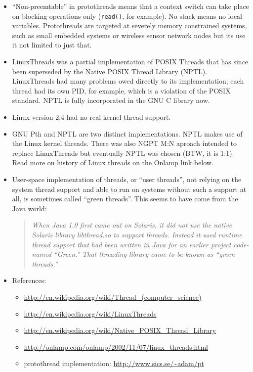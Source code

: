 \begin{itemize}
\item ``Non-preemtable'' in protothreads means that a context switch can take
place on blocking operations only (\texttt{read()}, for example). No stack means
no local variables. Protothreads are targeted at severely memory constrained
systems, such as small embedded systems or wireless sensor network nodes but its
use it not limited to just that.
\item LinuxThreads was a partial implementation of POSIX Threads that has since
been superseded by the Native POSIX Thread Library (NPTL). LinuxThreads had many
problems owed directly to its implementation; each thread had its own PID, for
example, which is a violation of the POSIX standard. NPTL is fully incorporated
in the GNU C library now.
\item Linux version 2.4 had no real kernel thread support.
\item \label{NGPT} GNU Pth and NPTL are two distinct implementations. NPTL makes
use of the Linux kernel threads. There was also NGPT M:N aproach intended to
replace LinuxThreads but eventually NPTL was chosen (BTW, it is 1:1). Read more
on history of Linux threads on the Onlamp link below.
\item User-space implementation of threads, or ``user threads'', not relying on
the system thread support and able to run on systems without such a support at
all, is sometimes called ``green threads''. This seems to have come from the
Java world:

\begin{quote}
\emph{When Java 1.0 first came out on Solaris, it did not use the native Solaris
library libthread.so to support threads. Instead it used runtime thread support
that had been written in Java for an earlier project code-named ``Green.'' That
threading library came to be known as ``green threads.''}
\end{quote}
\item References:
	\begin{itemize}
	\item \url{http://en.wikipedia.org/wiki/Thread\_(computer\_science)}
	\item \url{http://en.wikipedia.org/wiki/LinuxThreads}
	\item \url{http://en.wikipedia.org/wiki/Native\_POSIX\_Thread\_Library}
	\item \url{http://onlamp.com/onlamp/2002/11/07/linux\_threads.html}
	\item protothread implementation: \url{http://www.sics.se/~adam/pt}
	\end{itemize}
\end{itemize}


